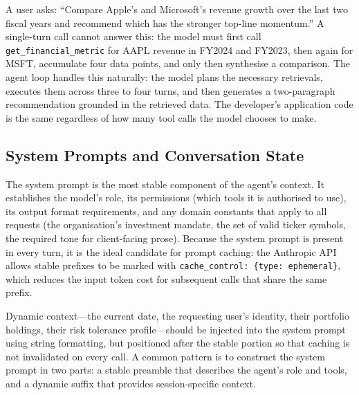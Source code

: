\begin{example}
\label{ex:research-agent}
A user asks: ``Compare Apple's and Microsoft's revenue growth over the last two fiscal
years and recommend which has the stronger top-line momentum.'' A single-turn call
cannot answer this: the model must first call \texttt{get\_financial\_metric} for
AAPL revenue in FY2024 and FY2023, then again for MSFT, accumulate four data points,
and only then synthesise a comparison. The agent loop handles this naturally: the model
plans the necessary retrievals, executes them across three to four turns, and then
generates a two-paragraph recommendation grounded in the retrieved data. The
developer's application code is the same regardless of how many tool calls the model
chooses to make.
\end{example}

\subsection{System Prompts and Conversation State}
\label{app:sdk-commercial:agent-loop:state}

The system prompt is the most stable component of the agent's context. It establishes
the model's role, its permissions (which tools it is authorised to use), its output
format requirements, and any domain constants that apply to all requests (the
organisation's investment mandate, the set of valid ticker symbols, the required tone
for client-facing prose). Because the system prompt is present in every turn, it is the
ideal candidate for prompt caching: the Anthropic API allows stable prefixes to be
marked with \texttt{cache\_control: \{type: ephemeral\}}, which reduces the input token
cost for subsequent calls that share the same prefix.

Dynamic context---the current date, the requesting user's identity, their portfolio
holdings, their risk tolerance profile---should be injected into the system prompt
using string formatting, but positioned after the stable portion so that caching is
not invalidated on every call. A common pattern is to construct the system prompt in
two parts: a stable preamble that describes the agent's role and tools, and a dynamic
suffix that provides session-specific context.

